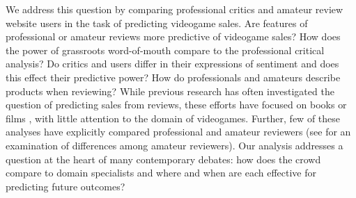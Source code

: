 \documentclass[letterpaper]{article}
\begin{document}
We address this question by comparing professional critics and amateur review website users in the task of predicting videogame sales. Are features of professional or amateur reviews more predictive of videogame sales? How does the power of grassroots word-of-mouth compare to the professional critical analysis? Do critics and users differ in their expressions of sentiment and does this effect their predictive power? How do professionals and amateurs describe products when reviewing? While previous research has often investigated the question of predicting sales from reviews, these efforts have focused on books \cite{gruhl2005predictive} or films \cite{dellarocas2007exploring} \cite{yu2012mining} \cite{duan2008online} \cite{liu2001word}, with little attention to the domain of videogames.
Further, few of these analyses have explicitly compared professional and amateur reviewers (see \cite{gilbert2010deja} for an examination of differences among amateur reviewers). Our analysis addresses a question at the heart of many contemporary debates: how does the crowd compare to domain specialists and where and when are each effective for predicting future outcomes?
\end{document}
